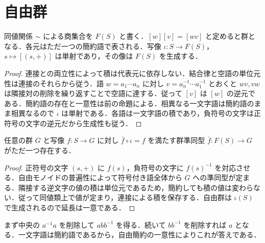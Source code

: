 \section{自由群}
\begin{prop}[自由群]
同値関係 $\sim$ による商集合を $F(S)$ と書く．$[w][v]=[wv]$ と定めると群となる．各元はただ一つの簡約語で表される．写像 $\iota:S\to F(S)$，$s\mapsto[(s,+)]$ は単射であり，その像は $F(S)$ を生成する．
\end{prop}
\begin{proof}
連接との両立性によって積は代表元に依存しない．結合律と空語の単位元性は連接のそれらから従う．語 $w=a_1\cdots a_n$ に対し $v=a_n^{-1}\cdots a_1^{-1}$ とおくと $wv,vw$ は隣接対の削除を繰り返すことで空語に達する．従って $[v]$ は $[w]$ の逆元である．簡約語の存在と一意性は前の命題による．相異なる一文字語は簡約語のまま相異なるので $\iota$ は単射である．各語は一文字語の積であり，負符号の文字は正符号の文字の逆元だから生成性も従う．
\end{proof}
\begin{prop}[自由群の普遍性]
任意の群 $G$ と写像 $f:S\to G$ に対し $\bar f\circ\iota=f$ を満たす群準同型 $\bar f:F(S)\to G$ がただ一つ存在する．
\end{prop}
\begin{proof}
正符号の文字 $(s,+)$ に $f(s)$，負符号の文字に $f(s)^{-1}$ を対応させる．自由モノイドの普遍性によって符号付き語全体から $G$ への準同型が定まる．隣接する逆文字の値の積は単位元であるため，簡約しても積の値は変わらない．従って同値類上で値が定まり，連接による積を保存する．自由群は $\iota(S)$ で生成されるので延長は一意である．
\end{proof}
\begin{prop}[符号付き語の簡約]
まず中央の $a^{-1}a$ を削除して $abb^{-1}$ を得る．続いて $bb^{-1}$ を削除すれば $a$ となる．一文字語は簡約語であるから，自由簡約の一意性によりこれが答えである．
\end{prop}
